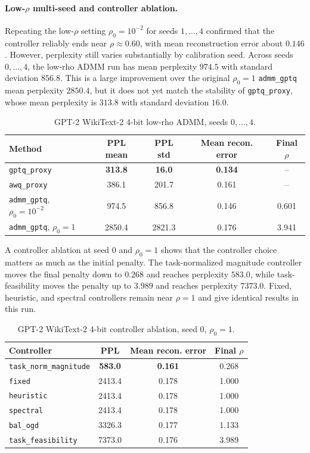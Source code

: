 \documentclass[11pt]{article}
\begin{document}
\paragraph{Low-\(\rho\) multi-seed and controller ablation.}
Repeating the low-\(\rho\) setting \(\rho_0=10^{-2}\) for seeds \(1,\ldots,4\)
confirmed that the controller reliably ends near \(\rho\approx 0.60\), with
mean reconstruction error about \(0.146\).  However, perplexity still varies
substantially by calibration seed.  Across seeds \(0,\ldots,4\), the low-rho
ADMM run has mean perplexity \(974.5\) with standard deviation \(856.8\).  This
is a large improvement over the original \(\rho_0=1\) \texttt{admm\_gptq}
mean perplexity \(2850.4\), but it does not yet match the stability of
\texttt{gptq\_proxy}, whose mean perplexity is \(313.8\) with standard
deviation \(16.0\).

\begin{table}[h]
\centering
\caption{GPT-2 WikiText-2 4-bit low-rho ADMM, seeds \(0,\ldots,4\).}
\label{tab:gpt2-low-rho-multiseed}
\begin{tabular}{lcccc}
\toprule
Method & PPL mean & PPL std & Mean recon. error & Final \(\rho\)\\
\midrule
\texttt{gptq\_proxy} & \textbf{313.8} & \textbf{16.0} & \textbf{0.134} & --\\
\texttt{awq\_proxy} & 386.1 & 201.7 & 0.161 & --\\
\texttt{admm\_gptq}, \(\rho_0=10^{-2}\) & 974.5 & 856.8 & 0.146 & 0.601\\
\texttt{admm\_gptq}, \(\rho_0=1\) & 2850.4 & 2821.3 & 0.176 & 3.941\\
\bottomrule
\end{tabular}
\end{table}

A controller ablation at seed 0 and \(\rho_0=1\) shows that the controller
choice matters as much as the initial penalty.  The task-normalized magnitude
controller moves the final penalty down to \(0.268\) and reaches perplexity
\(583.0\), while task-feasibility moves the penalty up to \(3.989\) and reaches
perplexity \(7373.0\).  Fixed, heuristic, and spectral controllers remain near
\(\rho=1\) and give identical results in this run.

\begin{table}[h]
\centering
\caption{GPT-2 WikiText-2 4-bit controller ablation, seed 0, \(\rho_0=1\).}
\label{tab:gpt2-controller-ablation}
\begin{tabular}{lccc}
\toprule
Controller & PPL & Mean recon. error & Final \(\rho\)\\
\midrule
\texttt{task\_norm\_magnitude} & \textbf{583.0} & \textbf{0.161} & 0.268\\
\texttt{fixed} & 2413.4 & 0.178 & 1.000\\
\texttt{heuristic} & 2413.4 & 0.178 & 1.000\\
\texttt{spectral} & 2413.4 & 0.178 & 1.000\\
\texttt{bal\_ogd} & 3326.3 & 0.177 & 1.133\\
\texttt{task\_feasibility} & 7373.0 & 0.176 & 3.989\\
\bottomrule
\end{tabular}
\end{table}
\end{document}
